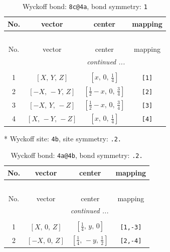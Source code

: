 \documentclass[fleqn,8pt]{jsarticle}
\begin{document}
\renewcommand{\arraystretch}{1.2}
\begin{longtable}{cccc}
\caption{Wyckoff bond: {\tt 8c@4a}, bond symmetry: {\tt 1}}
 \\
 \hline \hline
No. & vector & center & mapping \\ \hline \endfirsthead

\multicolumn{3}{l}{\tablename\ \thetable{}} \\
 \hline \hline
No. & vector & center & mapping \\ \hline \endhead

 \hline \hline
\multicolumn{3}{r}{\footnotesize\it continued ...} \\ \endfoot

 \hline \hline
\multicolumn{3}{r}{} \\ \endlastfoot

1 & $\left[ X,\, Y,\, Z \right]$ & $\left[ x,\, 0,\, \frac{1}{4} \right]$ & {\tt [1]} \\ \hline
2 & $\left[ - X,\, - Y,\, Z \right]$ & $\left[ \frac{1}{2} - x,\, 0,\, \frac{3}{4} \right]$ & {\tt [2]} \\ \hline
3 & $\left[ - X,\, Y,\, - Z \right]$ & $\left[ \frac{1}{2} - x,\, 0,\, \frac{3}{4} \right]$ & {\tt [3]} \\ \hline
4 & $\left[ X,\, - Y,\, - Z \right]$ & $\left[ x,\, 0,\, \frac{1}{4} \right]$ & {\tt [4]} \\
\end{longtable}
* Wyckoff site: {\tt 4b}, site symmetry: {\tt .2.}
\renewcommand{\arraystretch}{1.2}
\begin{longtable}{cccc}
\caption{Wyckoff bond: {\tt 4a@4b}, bond symmetry: {\tt .2.}}
 \\
 \hline \hline
No. & vector & center & mapping \\ \hline \endfirsthead

\multicolumn{3}{l}{\tablename\ \thetable{}} \\
 \hline \hline
No. & vector & center & mapping \\ \hline \endhead

 \hline \hline
\multicolumn{3}{r}{\footnotesize\it continued ...} \\ \endfoot

 \hline \hline
\multicolumn{3}{r}{} \\ \endlastfoot

1 & $\left[ X,\, 0,\, Z \right]$ & $\left[ \frac{1}{4},\, y,\, 0 \right]$ & {\tt [1,-3]} \\ \hline
2 & $\left[ - X,\, 0,\, Z \right]$ & $\left[ \frac{1}{4},\, - y,\, \frac{1}{2} \right]$ & {\tt [2,-4]} \\
\end{longtable}
\end{document}
